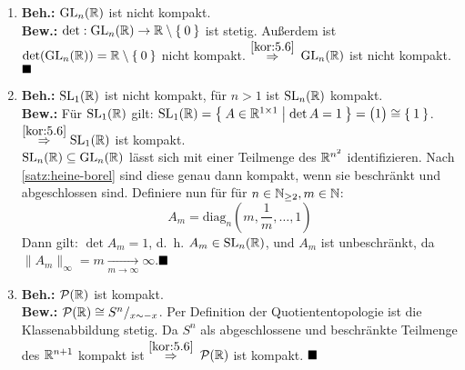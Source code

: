 \begin{solution}[\ref{ub3:aufg1}]
    \begin{enumerate}[label=(\alph*)]
        \item \textbf{Beh.:} $\mathrm{GL}_n(\mathbb{R})$ ist nicht kompakt.\\
            \textbf{Bew.:} $\det: \mathrm{GL}_n(\mathbb{R}) \rightarrow \mathbb{R} \setminus \Set{0}$
                ist stetig. Außerdem ist
                $\det(\mathrm{GL}_n(\mathbb{R})) = \mathbb{R} \setminus \Set{0}$ nicht
                kompakt. $\overset{\ref{kor:5.6}}{\Rightarrow}$
                $\mathrm{GL}_n(\mathbb{R})$ ist nicht kompakt. $\qed$
        \item \textbf{Beh.:} $\mathrm{SL}_1(\mathbb{R})$ ist nicht kompakt, für $n > 1$ ist $\mathrm{SL}_n(\mathbb{R})$ kompakt.\\
            \textbf{Bew.:} Für $\mathrm{SL}_1(\mathbb{R})$ gilt:
                $\mathrm{SL}_1(\mathbb{R}) = \Set{A \in \ensuremath{\mathbb{R}}^{1 \times 1} | \det A = 1} = \begin{pmatrix}1\end{pmatrix} \cong \Set{1}$.
                $\overset{\ref{kor:5.6}}{\Rightarrow} \mathrm{SL}_1(\mathbb{R})$ ist
                kompakt.\\

                $\mathrm{SL}_n(\mathbb{R}) \subseteq \mathrm{GL}_n(\mathbb{R})$ lässt sich mit einer
                Teilmenge des $\mathbb{R}^{n^2}$ identifizieren. Nach \cref{satz:heine-borel}
                sind diese genau dann kompakt, wenn sie beschränkt und
                abgeschlossen sind. Definiere nun für für $n \in \mathbb{N}_{\geq 2}, m \in \mathbb{N}$:
                \[A_m = \text{diag}_n(m, \frac{1}{m}, \dots, 1)\]
                Dann gilt: $\det A_m = 1$, d.~h. $A_m \in \mathrm{SL}_n(\mathbb{R})$,
                und $A_m$ ist unbeschränkt, da $\|A_m\|_\infty =m \xrightarrow[m \rightarrow \infty]{} \infty$.$\qed$
        \item \textbf{Beh.:} $\mathcal{P}(\mathbb{R})$ ist kompakt.\\
            \textbf{Bew.:} $\mathcal{P}(\mathbb{R}) \cong S^n/_{x \sim -x}$.
                Per Definition der Quotiententopologie ist die Klassenabbildung stetig.
                Da $S^n$ als abgeschlossene und beschränkte Teilmenge
                des $\mathbb{R}^{n+1}$ kompakt ist $\overset{\ref{kor:5.6}}{\Rightarrow}$
                $\mathcal{P}(\mathbb{R})$ ist kompakt. $\qed$
    \end{enumerate}
\end{solution}

